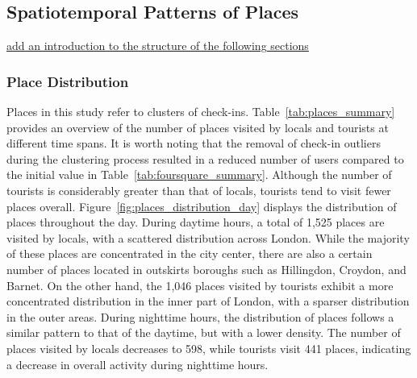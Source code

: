 \documentclass{article}
\theoremstyle{definition}
\theoremstyle{remark}
\begin{document}
\subsection{Spatiotemporal Patterns of Places}
\underline{add an introduction to the structure of the following sections}
\subsubsection{Place Distribution}
Places in this study refer to clusters of check-ins. Table~\ref{tab:places_summary} provides an overview of the number of places visited by locals and tourists at different time spans. It is worth noting that the removal of check-in outliers during the clustering process resulted in a reduced number of users compared to the initial value in Table~\ref{tab:foursquare_summary}. Although the number of tourists is considerably greater than that of locals, tourists tend to visit fewer places overall. Figure~\ref{fig:places_distribution_day} displays the distribution of places throughout the day. During daytime hours, a total of 1,525 places are visited by locals, with a scattered distribution across London. While the majority of these places are concentrated in the city center, there are also a certain number of places located in outskirts boroughs such as Hillingdon, Croydon, and Barnet. On the other hand, the 1,046 places visited by tourists exhibit a more concentrated distribution in the inner part of London, with a sparser distribution in the outer areas. During nighttime hours, the distribution of places follows a similar pattern to that of the daytime, but with a lower density. The number of places visited by locals decreases to 598, while tourists visit 441 places, indicating a decrease in overall activity during nighttime hours.
\end{document}
